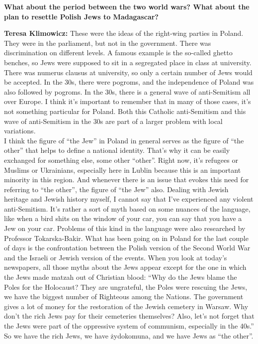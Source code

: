 \textbf{What about the period between the two world wars? What about the plan to resettle Polish Jews to Madagascar?}

\textbf{Teresa Klimowicz:} These were the ideas of the right-wing parties in Poland. They were in the parliament, but not in the government. There was discrimination on different levels. A famous example is the so-called ghetto benches, so Jews were supposed to sit in a segregated place in class at university. There was numerus clausus at university, so only a certain number of Jews would be accepted. In the 30s, there were pogroms, and the independence of Poland was also followed by pogroms. In the 30s, there is a general wave of anti-Semitism all over Europe. I think it's important to remember that in many of those cases, it's not something particular for Poland. Both this Catholic anti-Semitism and this wave of anti-Semitism in the 30s are part of a larger problem with local variations. \\
I think the figure of ``the Jew'' in Poland in general serves as the figure of ``the other'' that helps to define a national identity. That's why it can be easily exchanged for something else, some other ``other''. Right now, it's refugees or Muslims or Ukrainians, especially here in Lublin because this is an important minority in this region. And whenever there is an issue that evokes this need for referring to ``the other'', the figure of ``the Jew'' also. Dealing with Jewish heritage and Jewish history myself, I cannot say that I've experienced any violent anti-Semitism. It’s rather a sort of myth based on some nuances of the language, like when a bird shits on the window of your car, you can say that you have a Jew on your car. Problems of this kind in the language were also researched by Professor Tokarska-Bakir. What has been going on in Poland for the last couple of days is the confrontation between the Polish version of the Second World War and the Israeli or Jewish version of the events. When you look at today's newspapers, all those myths about the Jews appear except for the one in which the Jews made matzah out of Christian blood: ``Why do the Jews blame the Poles for the Holocaust? They are ungrateful, the Poles were rescuing the Jews, we have the biggest number of Righteous among the Nations. The government gives a lot of money for the restoration of the Jewish cemetery in Warsaw. Why don't the rich Jews pay for their cemeteries themselves? Also, let’s not forget that the Jews were part of the oppressive system of communism, especially in the 40s.'' So we have the rich Jews, we have żydokomuna, and we have Jews as ``the other''.  

